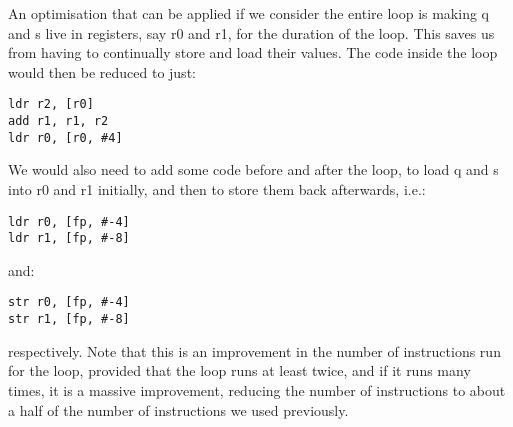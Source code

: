 An optimisation that can be applied if we consider the entire loop is making q and s live in registers, say r0 and r1, for the duration of the loop. This saves us from having to continually store and load their values. The code inside the loop would then be reduced to just:

\begin{lstlisting}
ldr r2, [r0]
add r1, r1, r2
ldr r0, [r0, #4]
\end{lstlisting}

We would also need to add some code before and after the loop, to load q and s into r0 and r1 initially, and then to store them back afterwards, i.e.:

\begin{lstlisting}
ldr r0, [fp, #-4]
ldr r1, [fp, #-8]
\end{lstlisting}

and:

\begin{lstlisting}
str r0, [fp, #-4]
str r1, [fp, #-8]
\end{lstlisting}

respectively. Note that this is an improvement in the number of instructions run for the loop, provided that the loop runs at least twice, and if it runs many times, it is a massive improvement, reducing the number of instructions to about a half of the number of instructions we used previously.
